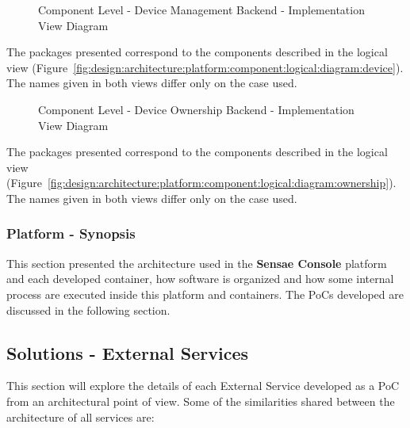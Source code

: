 \begin{figure}[H]
   \centering
   \resizebox{0.8\columnwidth}{!}
   {
      
   }
   \caption[Component Level - Device Management Backend - Implementation View Diagram]{Component Level - Device Management Backend - Implementation View Diagram}
   \label{fig:design:architecture:platform:component:development:diagram:device}
\end{figure}

The packages presented correspond to the components described in the logical view (Figure~\ref{fig:design:architecture:platform:component:logical:diagram:device}). The names given in both views differ only on the case used.

\begin{figure}[H]
   \centering
   \resizebox{0.8\columnwidth}{!}
   {
      
   }
   \caption[Component Level - Device Ownership Backend - Implementation View Diagram]{Component Level - Device Ownership Backend - Implementation View Diagram}
   \label{fig:design:architecture:platform:component:development:diagram:ownership}
\end{figure}

The packages presented correspond to the components described in the logical view (Figure~\ref{fig:design:architecture:platform:component:logical:diagram:ownership}). The names given in both views differ only on the case used.

\subsubsection{Platform - Synopsis}
\label{par:design:architecture:platform:synopsis}

This section presented the architecture used in the \textbf{Sensae Console} platform and each developed container, how software is organized and how some internal process are executed inside this platform and containers. The \gls{PoC}s developed are discussed in the following section.

\subsection{Solutions - External Services}
\label{subsec:design:architecture:solutions}

This section will explore the details of each External Service developed as a \gls{PoC} from an architectural point of view.
Some of the similarities shared between the architecture of all services are:

